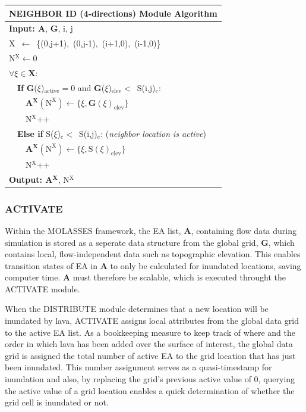 \documentclass[12pt,letter]{article}
\begin{document}
			\begin{center}
				\begin{tabular}{l}
					\toprule
					\textbf{NEIGHBOR ID (4-directions) Module Algorithm}\\
					\midrule
					\textbf{Input: A}, \textbf{G}, i, j\\
					X~$\leftarrow$~\{(0,j+1),~(0,j-1),~(i+1,0),~(i-1,0)\}\\
					N$^{\mathrm{X}}\leftarrow0$\\
					$\forall \xi \in \mathbf{X}$:\\
					~~\textbf{If} \textbf{G}($\xi$)$_{\textrm{active}}=0$ and \textbf{G}($\xi$)$_{\textrm{elev}}<$~S(i,j)$_e$:\\
					~~~~\textbf{A}$^{\mathbf{X}}({\mathrm{N^X}})\leftarrow\{\xi,\mathbf{G}(\xi)_{\mathrm{elev}}\}$\\
					~~~~N$^{\mathrm{X}}$++\\
					~~\textbf{Else if} S($\xi$)$_e<$~S(i,j)$_e$: (\textit{neighbor location is active})\\
					~~~~\textbf{A}$^{\mathbf{X}}({\mathrm{N^X}})\leftarrow\{\xi,\mathrm{S}(\xi)_{\mathrm{elev}}\}$\\
					~~~~N$^{\mathrm{X}}$++\\
					\textbf{Output: A}$^{\mathbf{X}}$, N$^{\mathrm{X}}$\\
					\bottomrule
				\end{tabular}
			\end{center}
			
		\subsubsection{ACTIVATE}
			Within the MOLASSES framework, the EA list, \textbf{A}, containing flow data during simulation is stored as a seperate data structure from the global grid, \textbf{G}, which contains local, flow-independent data such as topographic elevation. This enables transition states of EA in \textbf{A} to only be calculated for inundated locations, saving computer time. \textbf{A} must therefore be scalable, which is executed throught the ACTIVATE module.
			
			When the DISTRIBUTE module determines that a new location will be inundated by lava, ACTIVATE assigns local attributes from the global data grid to the active EA list. As a bookkeeping measure to keep track of where and the order in which lava has been added over the surface of interest, the global data grid is assigned the total number of active EA to the grid location that has just been inundated. This number assignment serves as a quasi-timestamp for inundation and also, by replacing the grid's previous active value of 0, querying the active value of a grid location enables a quick determination of whether the grid cell is inundated or not.
			
\end{document}
